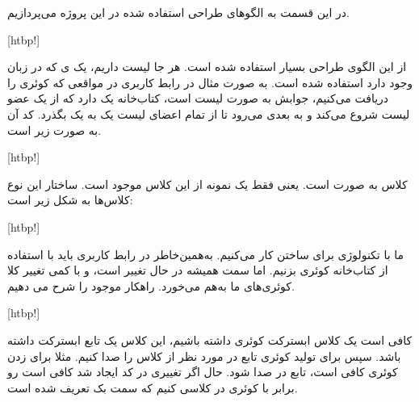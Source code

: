 

در این قسمت به الگوهای طراحی  استفاده شده در این پروژه می‌پردازیم.


	 
%	
	[htbp!]
	
	از این الگوی طراحی بسیار استفاده شده است. هر جا لیست داریم، یک  ی  که در زبان وجود دارد استفاده شده است. به صورت مثال در رابط کاربری در مواقعی که کوئری‌ را دریافت می‌کنیم، جوابش به صورت لیست است، کتاب‌خانه  یک  دارد که از یک عضو لیست شروع می‌کند و به بعدی می‌رود تا از تمام اعضای لیست یک به یک بگذرد. کد آن به صورت زیر است.
	
%	
	[htbp!]
	
	
	 
	
کلاس  به صورت  است. یعنی فقط یک نمونه از این کلاس موجود است. ساختار این نوع کلاس‌ها به شکل زیر است:

%
	[htbp!]
	
	 
	
	ما با تکنولوژی  برای ساختن  کار می‌کنیم. به‌همین‌خاطر در رابط کاربری باید با استفاده از کتاب‌خانه  کوئری بزنیم. اما سمت  همیشه در حال تغییر است، و با کمی تغییر کلا کوئری‌های ما به‌هم می‌خورد. راهکار موجود را شرح می دهیم.
	
		[htbp!]
		
		کافی است یک کلاس ابسترکت کوئری داشته باشیم، این کلاس یک تابع ابسترکت  داشته باشد. سپس برای تولید کوئری تابع  در  مورد نظر از کلاس را صدا کنیم. مثلا برای زدن کوئری  کافی است، تابع  در  صدا شود. حال اگر تغییری در کد ایجاد شد کافی است  رو برابر با کوئری در کلاسی کنیم که سمت بک تعریف شده است.
